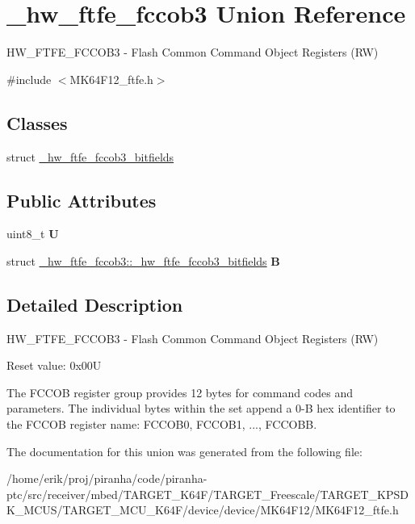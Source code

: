 \hypertarget{union__hw__ftfe__fccob3}{}\section{\+\_\+hw\+\_\+ftfe\+\_\+fccob3 Union Reference}
\label{union__hw__ftfe__fccob3}


H\+W\+\_\+\+F\+T\+F\+E\+\_\+\+F\+C\+C\+O\+B3 -\/ Flash Common Command Object Registers (RW)  




{\ttfamily \#include $<$M\+K64\+F12\+\_\+ftfe.\+h$>$}

\subsection*{Classes}
\begin{DoxyCompactItemize}
\item 
struct \hyperlink{struct__hw__ftfe__fccob3_1_1__hw__ftfe__fccob3__bitfields}{\+\_\+hw\+\_\+ftfe\+\_\+fccob3\+\_\+bitfields}
\end{DoxyCompactItemize}
\subsection*{Public Attributes}
\begin{DoxyCompactItemize}
\item 
uint8\+\_\+t {\bfseries U}\hypertarget{union__hw__ftfe__fccob3_a30e4725e8ade14862742578a6758c85f}{}\label{union__hw__ftfe__fccob3_a30e4725e8ade14862742578a6758c85f}

\item 
struct \hyperlink{struct__hw__ftfe__fccob3_1_1__hw__ftfe__fccob3__bitfields}{\+\_\+hw\+\_\+ftfe\+\_\+fccob3\+::\+\_\+hw\+\_\+ftfe\+\_\+fccob3\+\_\+bitfields} {\bfseries B}\hypertarget{union__hw__ftfe__fccob3_a1eecf310a10ff2adbb8245ded61fa6b0}{}\label{union__hw__ftfe__fccob3_a1eecf310a10ff2adbb8245ded61fa6b0}

\end{DoxyCompactItemize}


\subsection{Detailed Description}
H\+W\+\_\+\+F\+T\+F\+E\+\_\+\+F\+C\+C\+O\+B3 -\/ Flash Common Command Object Registers (RW) 

Reset value\+: 0x00U

The F\+C\+C\+OB register group provides 12 bytes for command codes and parameters. The individual bytes within the set append a 0-\/B hex identifier to the F\+C\+C\+OB register name\+: F\+C\+C\+O\+B0, F\+C\+C\+O\+B1, ..., F\+C\+C\+O\+BB. 

The documentation for this union was generated from the following file\+:\begin{DoxyCompactItemize}
\item 
/home/erik/proj/piranha/code/piranha-\/ptc/src/receiver/mbed/\+T\+A\+R\+G\+E\+T\+\_\+\+K64\+F/\+T\+A\+R\+G\+E\+T\+\_\+\+Freescale/\+T\+A\+R\+G\+E\+T\+\_\+\+K\+P\+S\+D\+K\+\_\+\+M\+C\+U\+S/\+T\+A\+R\+G\+E\+T\+\_\+\+M\+C\+U\+\_\+\+K64\+F/device/device/\+M\+K64\+F12/M\+K64\+F12\+\_\+ftfe.\+h\end{DoxyCompactItemize}
